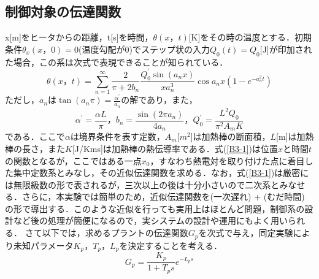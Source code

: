 \documentclass[12pt]{jsarticle}
\begin{document}
\subsection{制御対象の伝達関数}
x[m]をヒータからの距離，t[s]を時間，$\theta(x，t)$[K]をその時の温度とする．初期条件$\theta_x(x，0)=0$(温度勾配が0)でステップ状の入力$Q_0(t)=Q_0$[J]が印加された場合，この系は次式で表現できることが知られている．
\begin{equation}
  \label{B3-1}
  \theta(x，t) = \sum_{n=1}^{\infty}\frac{2}{\pi+2b_n}\frac{Q_0^{\prime}\sin(a_nx)}{xa_n^3}\cos{a_nx(1-e^{-a_n^2t})}
\end{equation}
ただし，$a_n$は$\tan(a_n\pi) = \frac{\alpha^{\prime}}{a_n}$の解であり，また，
\begin{displaymath}
  \alpha^{\prime} = \frac{\alpha L}{\pi}， b_n = \frac{\sin(2\pi a_n)}{4a_n}， Q_0^{\prime} = \frac{L^2Q_0}{\pi^2A_mK}
\end{displaymath}
である．ここで$\alpha$は境界条件を表す定数，$A_m$[$m^2$]は加熱棒の断面積，$L$[m]は加熱棒の長さ，また$K$[J/Kms]は加熱棒の熱伝導率である．式(\ref{B3-1})は位置$x$と時間$t$の関数となるが，ここではある一点$x_0$，すなわち熱電対を取り付けた点に着目した集中定数系とみなし，その近似伝達関数を求める．なお，式(\ref{B3-1})は厳密には無限級数の形で表されるが，三次以上の後は十分小さいので二次系とみなせる．さらに，本実験では簡単のため，近似伝達関数を(一次遅れ) + (むだ時間) の形で導出する．このような近似を行っても実用上はほとんど問題，制御系の設計など後の処理が簡便になるので，実システムの設計や運用にもよく用いられる．
さて以下では，求めるプラントの伝達関数$G_p$を次式で与え，同定実験により未知パラメータ$K_p$，$T_p$，$L_p$を決定することを考える．
\begin{equation}
  \label{B3-2}
  G_p = \frac{K_p}{1+T_ps}e^{-L_ps}
\end{equation}
\end{document}
